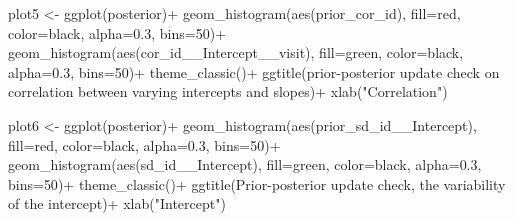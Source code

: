 \documentclass[
]{article}
\newenvironment{Shaded}{\begin{snugshade}}{\end{snugshade}}
\newcommand{\AttributeTok}[1]{\textcolor[rgb]{0.77,0.63,0.00}{#1}}
\newcommand{\DecValTok}[1]{\textcolor[rgb]{0.00,0.00,0.81}{#1}}
\newcommand{\FloatTok}[1]{\textcolor[rgb]{0.00,0.00,0.81}{#1}}
\newcommand{\FunctionTok}[1]{\textcolor[rgb]{0.00,0.00,0.00}{#1}}
\newcommand{\NormalTok}[1]{#1}
\newcommand{\OtherTok}[1]{\textcolor[rgb]{0.56,0.35,0.01}{#1}}
\newcommand{\SpecialCharTok}[1]{\textcolor[rgb]{0.00,0.00,0.00}{#1}}
\newcommand{\StringTok}[1]{\textcolor[rgb]{0.31,0.60,0.02}{#1}}
\begin{document}
\begin{Shaded}
\begin{Highlighting}[]
\NormalTok{plot5 }\OtherTok{\textless{}{-}} \FunctionTok{ggplot}\NormalTok{(posterior)}\SpecialCharTok{+}
  \FunctionTok{geom\_histogram}\NormalTok{(}\FunctionTok{aes}\NormalTok{(prior\_cor\_id), }\AttributeTok{fill=}\StringTok{\textquotesingle{}red\textquotesingle{}}\NormalTok{, }\AttributeTok{color=}\StringTok{\textquotesingle{}black\textquotesingle{}}\NormalTok{, }\AttributeTok{alpha=}\FloatTok{0.3}\NormalTok{, }\AttributeTok{bins=}\DecValTok{50}\NormalTok{)}\SpecialCharTok{+}
  \FunctionTok{geom\_histogram}\NormalTok{(}\FunctionTok{aes}\NormalTok{(cor\_id\_\_Intercept\_\_visit), }\AttributeTok{fill=}\StringTok{\textquotesingle{}green\textquotesingle{}}\NormalTok{, }\AttributeTok{color=}\StringTok{\textquotesingle{}black\textquotesingle{}}\NormalTok{, }\AttributeTok{alpha=}\FloatTok{0.3}\NormalTok{, }\AttributeTok{bins=}\DecValTok{50}\NormalTok{)}\SpecialCharTok{+}
  \FunctionTok{theme\_classic}\NormalTok{()}\SpecialCharTok{+}
  \FunctionTok{ggtitle}\NormalTok{(}\StringTok{\textquotesingle{}prior{-}posterior update check on correlation between varying intercepts and slopes\textquotesingle{}}\NormalTok{)}\SpecialCharTok{+}
  \FunctionTok{xlab}\NormalTok{(}\StringTok{"Correlation"}\NormalTok{)}

\NormalTok{plot6 }\OtherTok{\textless{}{-}} \FunctionTok{ggplot}\NormalTok{(posterior)}\SpecialCharTok{+}
  \FunctionTok{geom\_histogram}\NormalTok{(}\FunctionTok{aes}\NormalTok{(prior\_sd\_id\_\_Intercept), }\AttributeTok{fill=}\StringTok{\textquotesingle{}red\textquotesingle{}}\NormalTok{, }\AttributeTok{color=}\StringTok{\textquotesingle{}black\textquotesingle{}}\NormalTok{, }\AttributeTok{alpha=}\FloatTok{0.3}\NormalTok{, }\AttributeTok{bins=}\DecValTok{50}\NormalTok{)}\SpecialCharTok{+}
  \FunctionTok{geom\_histogram}\NormalTok{(}\FunctionTok{aes}\NormalTok{(sd\_id\_\_Intercept), }\AttributeTok{fill=}\StringTok{\textquotesingle{}green\textquotesingle{}}\NormalTok{, }\AttributeTok{color=}\StringTok{\textquotesingle{}black\textquotesingle{}}\NormalTok{, }\AttributeTok{alpha=}\FloatTok{0.3}\NormalTok{, }\AttributeTok{bins=}\DecValTok{50}\NormalTok{)}\SpecialCharTok{+}
  \FunctionTok{theme\_classic}\NormalTok{()}\SpecialCharTok{+}
  \FunctionTok{ggtitle}\NormalTok{(}\StringTok{\textquotesingle{}Prior{-}posterior update check, the variability of the intercept\textquotesingle{}}\NormalTok{)}\SpecialCharTok{+}
  \FunctionTok{xlab}\NormalTok{(}\StringTok{"Intercept"}\NormalTok{)}


\end{Highlighting}
\end{Shaded}
\end{document}
